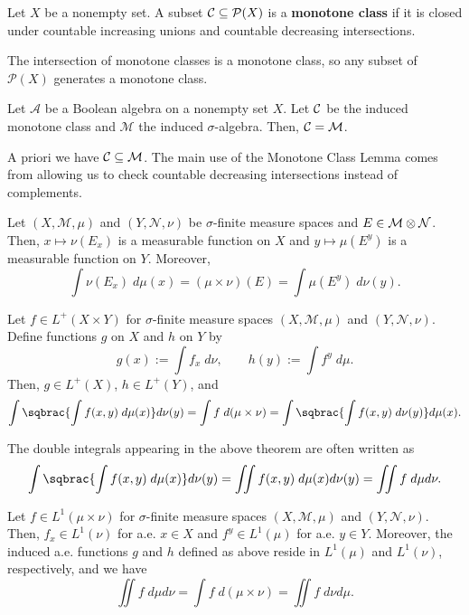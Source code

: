 \documentclass[11pt]{article}
\renewcommand{\A}{\mathcal{A}}
\newcommand{\M}{\mathcal{M}}
\renewcommand{\N}{\mathcal{N}}
\renewcommand{\P}{\mathcal{P}}
\begin{document}
\begin{definition}
Let $X$ be a nonempty set. A subset $\mc{C}\subset\P(X)$ is a \textbf{monotone class} if it is closed under countable increasing unions and countable decreasing intersections.
\end{definition}

The intersection of monotone classes is a monotone class, so any subset of $\P(X)$ generates a monotone class.

\begin{lemma}
Let $\A$ be a Boolean algebra on a nonempty set $X$. Let $\mathcal{C}$ be the induced monotone class and $\M$ the induced $\sigma$-algebra. Then, $\mc{C}=\M$.
\end{lemma}

A priori we have $\mc{C}\subset\M$. The main use of the Monotone Class Lemma comes from allowing us to check countable decreasing intersections instead of complements.

\begin{theorem}
Let $(X,\M,\mu)$ and $(Y,\N,\nu)$ be $\sigma$-finite measure spaces and $E\in\M\tensor\N$. Then, $x\mapsto\nu(E_x)$ is a measurable function on $X$ and $y\mapsto\mu(E^y)$ is a measurable function on $Y$. Moreover, 
$$\int\nu(E_x)\;d\mu(x)=(\mu\times\nu)(E)=\int\mu(E^y)\;d\nu(y).$$
\end{theorem}

\begin{theorem}[Tonelli]
Let $f\in L^+(X\times Y)$ for $\sigma$-finite measure spaces $(X,\M,\mu)$ and $(Y,\N,\nu)$. Define functions $g$ on $X$ and $h$ on $Y$ by 
$$g(x):=\int f_x\;d\nu,\qquad h(y):=\int f^y\;d\mu.$$
Then, $g\in L^+(X)$, $h\in L^+(Y)$, and 
\begin{align*}
\int\sqbrac{\int f(x,y)\;d\mu(x)}d\nu(y)
=\int f\;d(\mu\times\nu)
=\int\sqbrac{\int f(x,y)\;d\nu(y)}d\mu(x).
\end{align*}
\end{theorem}

The double integrals appearing in the above theorem are often written as 
$$\int\sqbrac{\int f(x,y)\;d\mu(x)}d\nu(y)=\iint f(x,y)\;d\mu(x)d\nu(y)=\iint f\;d\mu d\nu.$$

\begin{theorem}[Fubini]
Let $f\in L^1(\mu\times\nu)$ for $\sigma$-finite measure spaces $(X,\M,\mu)$ and $(Y,\N,\nu)$. Then, $f_x\in L^1(\nu)$ for a.e. $x\in X$ and $f^y\in L^1(\mu)$ for a.e. $y\in Y$. Moreover, the induced a.e. functions $g$ and $h$ defined as above reside in $L^1(\mu)$ and $L^1(\nu)$, respectively, and we have 
$$\iint f\;d\mu d\nu=\int f\;d(\mu\times\nu)=\iint f\;d\nu d\mu.$$
\end{theorem}
\end{document}
